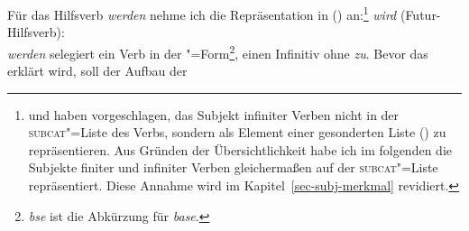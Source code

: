 Für das Hilfsverb \emph{werden} nehme ich die Repräsentation in () an:\footnote{\label{subj-fn}%
        \citet{Pollard90a} und \citet*{Kiss92} haben vorgeschlagen, das Subjekt infiniter
Verben nicht in der \textsc{subcat}"=Liste des Verbs, sondern als Element einer gesonderten Liste (\subj)
zu repräsentieren. Aus Gründen der Übersichtlichkeit habe ich im folgenden die Subjekte finiter
und infiniter Verben gleichermaßen auf der \textsc{subcat}"=Liste repräsentiert. Diese Annahme
wird im Kapitel~\ref{sec-subj-merkmal} revidiert.%
}
\eas
\label{le-wird}
\emph{wird} (Futur-Hilfsverb):\\
\zs
\emph{werden} selegiert ein Verb in der "=Form\footnote{%
  \emph{bse} ist die Abkürzung für \emph{base}.%
}, \dash einen Infinitiv ohne \emph{zu}. Bevor das \lexm erklärt wird, soll der Aufbau der \subcatl
